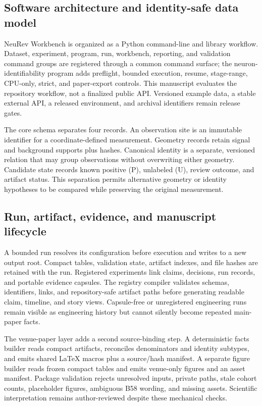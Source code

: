 \subsection{Software architecture and identity-safe data model}

NeuRev Workbench is organized as a Python command-line and library workflow.
Dataset, experiment, program, run, workbench, reporting, and validation command
groups are registered through a common command surface; the neuron-identifiability
program adds preflight, bounded execution, resume, stage-range, CPU-only, strict,
and paper-export controls. This manuscript evaluates the repository workflow,
not a finalized public API. Versioned example data, a stable external API, a
released environment, and archival identifiers remain release gates.

The core schema separates four records. An observation site is an immutable
identifier for a coordinate-defined measurement. Geometry records retain signal
and background supports plus hashes. Canonical identity is a separate,
versioned relation that may group observations without overwriting either
geometry. Candidate state records known positive (P), unlabeled (U), review
outcome, and artifact status. This separation permits alternative geometry or
identity hypotheses to be compared while preserving the original measurement.

\subsection{Run, artifact, evidence, and manuscript lifecycle}

A bounded run resolves its configuration before execution and writes to a new
output root. Compact tables, validation state, artifact indexes, and file hashes
are retained with the run. Registered experiments link claims, decisions, run
records, and portable evidence capsules. The registry compiler validates schemas,
identifiers, links, and repository-safe artifact paths before generating readable
claim, timeline, and story views. Capsule-free or unregistered engineering runs
remain visible as engineering history but cannot silently become repeated
main-paper facts.

The venue-paper layer adds a second source-binding step. A deterministic facts
builder reads \VenueFactSourceCount{} compact artifacts, reconciles denominators and identity
subtypes, and emits shared \LaTeX{} macros plus a source/hash manifest. A separate
figure builder reads frozen compact tables and emits venue-only figures and an
asset manifest. Package validation rejects unresolved inputs, private paths,
stale cohort counts, placeholder figures, ambiguous B58 wording, and missing
assets. Scientific interpretation remains author-reviewed despite these
mechanical checks.

